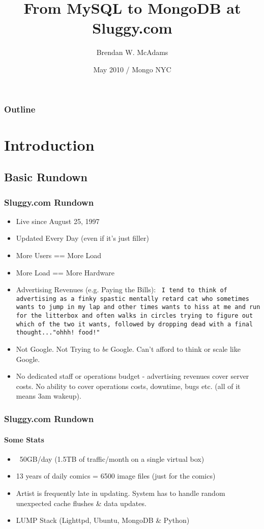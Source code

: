 \documentclass{beamer}
\title[From MySQL to MongoDB at Sluggy.com] %
{From MySQL to MongoDB at Sluggy.com}
\author[Brendan W. McAdams] 
{Brendan W. McAdams}
\institute[Sluggy.com] %
{ Sluggy Freelance, LLC (sluggy.com) / Evil Monkey Labs, LLC. }
\date[Mongo NYC, May 2010] %
{May 2010 / Mongo NYC}
\begin{document}
\begin{frame}
  \titlepage
\end{frame}

\begin{frame}
\frametitle{Outline}
  \tableofcontents
\end{frame}

\section{Introduction}

\subsection[About Sluggy.com]{Basic Rundown}
\begin{frame}
\frametitle{Sluggy.com Rundown}
	\begin{itemize}
		\item<2-> Live since August 25, 1997
		\item<3-> Updated Every Day (even if it's just filler)
		\item<4-> More Users == More Load
		\item<5-> More Load == More Hardware
		\item<6-> Advertising Revenues (e.g. Paying the Bills): \texttt{\tiny
		 I tend to think of advertising as a finky spastic mentally retard cat who sometimes wants to jump in my lap and other times wants to hiss at me and run for the litterbox and often walks in circles trying to figure out which of the two it wants, followed by dropping dead with a final thought..."ohhh! food!"}
		\item<7-> Not Google. Not Trying to {\em be} Google. Can't afford to think or scale like Google.
		\item<8-> No dedicated staff or operations budget - advertising revenues cover server costs.  No ability to cover operations costs, downtime, bugs etc. (all of it means 3am wakeup).
	\end{itemize}
\end{frame}

\begin{frame}
\frametitle{Sluggy.com Rundown}
\framesubtitle{Some Stats}
	\begin{itemize}
		\item ~50GB/day (1.5TB of traffic/month on a single virtual box)
		\item 13 years of daily comics = 6500 image files (just for the comics)
		\item Artist is frequently late in updating.  System has to handle random unexpected cache flushes \& data updates.
		\item LUMP Stack (Lighttpd, Ubuntu, MongoDB \& Python)
	\end{itemize}
\end{frame}
\end{document}
